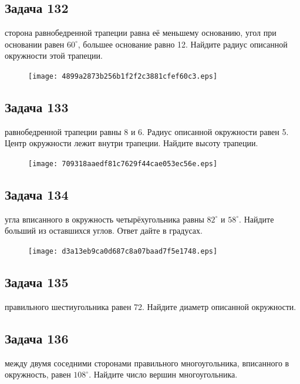 \documentclass[a4paper,10pt]{article} %
\begin{document}
\begin{spacing}{1.0}
{\subsection*{Задача 132}
 сторона равнобедренной трапеции равна её меньшему основанию, угол при основании равен $60^\circ$, большее основание равно 12. Найдите радиус описанной окружности этой трапеции. 

\vspace{1.5cm}

\begin{figure}{\texttt{[image: 4899a2873b256b1f2f2c3881cfef60c3.eps]}}\end{figure}
\subsection*{Задача 133}
 равнобедренной трапеции равны 8 и 6. Радиус описанной окружности равен 5.
Центр окружности лежит внутри трапеции. Найдите высоту трапеции.

\vspace{1.5cm}

\begin{figure}{\texttt{[image: 709318aaedf81c7629f44cae053ec56e.eps]}}\end{figure}
\subsection*{Задача 134}
 угла вписанного в окружность четырёхугольника равны $82^\circ$ и $58^\circ$. Найдите больший из оставшихся углов. Ответ дайте в градусах.

\vspace{1.5cm}

\begin{figure}{\texttt{[image: d3a13eb9ca0d687c8a07baad7f5e1748.eps]}}\end{figure}
\subsection*{Задача 135}
 правильного шестиугольника равен 72. Найдите диаметр описанной окружности.

\vspace{1.5cm}

\subsection*{Задача 136}
 между двумя соседними сторонами правильного многоугольника, вписанного в окружность, равен $108^\circ$. Найдите число вершин многоугольника.

}
\end{spacing}
\end{document}
